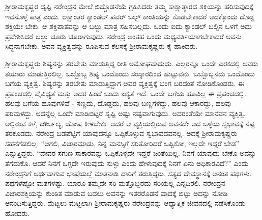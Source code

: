 \vskip 2pt

ಶ‍್ರೀರಾಮಕೃಷ್ಣರ ದೃಷ್ಟಿ ನರೇಂದ್ರನ ಮೇಲೆ ಬಿದ್ದೊಡನೆಯೆ ಗ್ರಹಿಸಿದರು ತಮ್ಮ ಸಾಕ್ಷಾತ್ಕಾರದ ಶಕ್ತಿಯನ್ನು ಹರಿಸುವುದಕ್ಕೆ ಇವನೊಳ್ಳೆ ಪಾತ್ರ ಎಂದು. ಲಕ್ಷಾಂತರ ಕ್ಯಾಂಡಲ್ ಪವರ್ ಬಲ್ಬ್ ಕಾಂತಿಯನ್ನು ಕೊಡಬೇಕಾದರೆ ಅದಕ್ಕೊಂದು ದೊಡ್ಡ ಶಕ್ತಿಯೇ ಬೇಕು. ಆ ಶಕ್ತಿಪಾತವನ್ನು ಆ ಬಲ್ಬು ಮಾತ್ರ ಸಹಿಸಬಲ್ಲದು. ಒಂದು ಐದು ಕ್ಯಾಂಡಲ್ ಬಲ್ಬಿನ ಒಳಗೆ ಅದು ಪ್ರವೇಶಿಸಿದರೆ ಬಲ್ಬು ಚೂರು ಚೂರಾಗುವುದು. ನರೇಂದ್ರ ಅಂತಹ ಒಂದು ಮಧ್ಯವರ್ತಿಯಾಗಬೇಕಾದರೆ ಅವನು ಸಿದ್ಧನಾಗಬೇಕು. ಅವನ ವ್ಯಕ್ತಿತ್ವವನ್ನು ರೂಪಿಸುವ ಕೆಲಸಕ್ಕೆ ಶ‍್ರೀರಾಮಕೃಷ್ಣರು ಕೈ ಹಾಕಿದರು.

\vskip 2pt

ಶ‍್ರೀರಾಮಕೃಷ್ಣರು ಶಿಷ್ಯನನ್ನು ತರಬೇತು ಮಾಡುತ್ತಿದ್ದ ರೀತಿ ಅಮೋಘವಾದುದು. ಎಲ್ಲರನ್ನೂ ಒಂದೇ ಎರಕದಲ್ಲಿ ಅವರು ತಯಾರು ಮಾಡುತ್ತಿರಲಿಲ್ಲ. ಒಬ್ಬೊಬ್ಬ ಶಿಷ್ಯ ಒಂದೊಂದು ಸಂಸ್ಕಾರದಿಂದ ಹುಟ್ಟುವನು. ಒಬ್ಬೊಬ್ಬನದು ಒಂದೊಂದು ಬಗೆಯ ವ್ಯಕ್ತಿತ್ವ. ಶಿಷ್ಯರನ್ನು ತರಬೇತು ಮಾಡುತ್ತಿದ್ದಾಗ ಅವರ ವ್ಯಕ್ತಿತ್ವಕ್ಕೆ ಭಂಗ ಬರದಂತೆ ನೋಡಿಕೊಂಡರು. ಈ ಪ್ರಪಂಚದಲ್ಲಿ ವೈವಿಧ್ಯತೆ ಮತ್ತು ಅದರ ಹಿಂದೆ ಒಂದು ಐಕ್ಯತೆ ಇದೆ. ಒಂದೇ ಬಗೆಯ ಹೂವಿಲ್ಲ ಈ ಪ್ರಪಂಚದಲ್ಲಿ. ಹಲವು ಬಗೆಯ ಹೂವುಗಳಿವೆ - ಸಣ್ಣದು, ದೊಡ್ಡದು, ಹಲವು ಬಣ್ಣಗಳದ್ದು, ಹಲವು ಆಕಾರದ್ದು, ಹಲವು ಪರಿಮಳದ್ದು. ಅದನ್ನೆಲ್ಲ ಒಂದೇ ಮಾಡಿಬಿಟ್ಟರೆ ಸೃಷ್ಟಿ ಅಷ್ಟು ನಷ್ಟವಾಗುವುದು. ಅದರಂತೆಯೇ ಮಾನವನ ವ್ಯಕ್ತಿತ್ವ. ಅಲ್ಲಿರುವ ಕಳೆ, ದೌರ್ಬಲ್ಯ, ದೋಷ ಕೀಳಬೇಕು. ಆದರೆ ಆ ವ್ಯಕ್ತಿಯಲ್ಲಿರುವ ಅವನದೇ ಆದ ಒಳ್ಳೆಯ ಸ್ವಭಾವಕ್ಕೆ ನಷ್ಟ ತರಕೂಡದು. ನರೇಂದ್ರ ಬಡಪೆಟ್ಟಿಗೆ ಯಾವುದನ್ನೂ ಒಪ್ಪಿಕೊಳ್ಳುವ ಸ್ವಭಾವದವನಲ್ಲ. ಅದಕ್ಕೆ ಶ‍್ರೀರಾಮಕೃಷ್ಣರು ಸಹನೆಗೆಡಲಿಲ್ಲ. “ಆಗಲಿ, ವಿಚಾರಮಾಡು, ನಿನ್ನ ಮನಸ್ಸಿಗೆ ಸರಿತೋರಿದರೆ ಒಪ್ಪಿಕೋ, ಇಲ್ಲದೇ ಇದ್ದರೆ ಬೇಡ” ಎನ್ನುತ್ತಿದ್ದರು. “ದೇವರ ಸಗುಣ ಸಾಕಾರವನ್ನು ಒಪ್ಪಿಕೊಳ್ಳದೇ ಇದ್ದರೆ ಚಿಂತೆಯಿಲ್ಲ. ನಿನಗೆ ಯಾವುದು ಬೇಕೊ ಅದನ್ನು ತೆಗೆದುಕೊ. ಆದರೆ ನಿನಗೆ ಒಗ್ಗದೇ ಇರುವುದು ಸುಳ್ಳು ಎಂದು ಹೇಳುವುದಕ್ಕೆ ನಿನಗೆ ಏನು ಅಧಿಕಾರವಿದೆ?” ಎಂದು ನರೇಂದ್ರನಿಗೆ ಅರ್ಥವಾಗುವ ಭಾಷೆಯಲ್ಲೆ ಮಾತನಾಡಿ ದಾರಿಗೆ ತರುತ್ತಿದ್ದರು. ಸತ್ಯದ ದೇವಸ್ಥಾನಕ್ಕೆ ಅನಂತ ಪಥಗಳು. ಪಥಗಳೆಷ್ಟೋ ಮತಗಳಷ್ಟು. ಯಾರೂ ತಮ್ಮದೇ ಸರಿ ಮತ್ತೊಬ್ಬರದು ಸರಿಯಲ್ಲ ಎನ್ನದಿರಲಿ. ನರೇಂದ್ರನ ವಿಚಾರಶಕ್ತಿಯನ್ನು ಕುಂಠಿತ ಮಾಡುವ ಬದಲು ಅವನನ್ನು ಇತರರೊಡನೆ ವಾದಕ್ಕೆ ಬಿಟ್ಟು ಅದನ್ನು ನೋಡಿ ಆನಂದಿಸುತ್ತಿದ್ದರು. ಮೆಟ್ಟಲು ಮೆಟ್ಟಲಾಗಿ ಶ‍್ರೀರಾಮಕೃಷ್ಣರು ನರೇಂದ್ರನನ್ನು ಆಧ್ಯಾತ್ಮಿಕ ಜೀವನದಲ್ಲಿ ನಡೆಸಿಕೊಂಡು ಹೋದರು.

